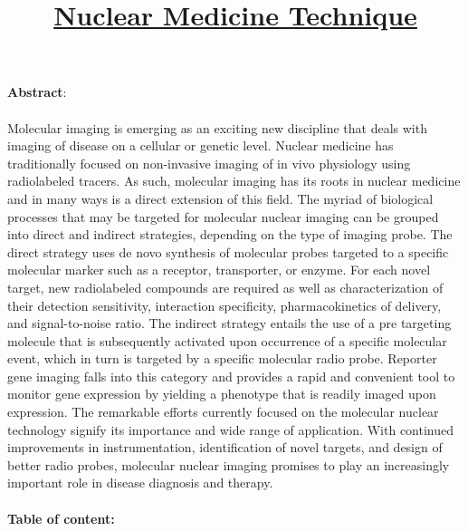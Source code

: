\documentclass[12pt]{article}
\title{\underline{Nuclear Medicine Technique}}
\date{}
\begin{document}
\maketitle
\noindent
\textbf{\large Abstract}:\\ \\ \large Molecular imaging is emerging as an exciting new discipline that deals with imaging of disease on a cellular or genetic level. Nuclear medicine has traditionally focused on non-invasive imaging of in vivo physiology using radiolabeled tracers. As such, molecular imaging has its roots in nuclear medicine and in many ways is a direct extension of this field. The myriad of biological processes that may be targeted for molecular nuclear imaging can be grouped into direct and indirect strategies, depending on the type of imaging probe. The direct strategy uses de novo synthesis of molecular probes targeted to a specific molecular marker such as a receptor, transporter, or enzyme. For each novel target, new radiolabeled compounds are required as well as characterization of their detection sensitivity, interaction specificity, pharmacokinetics of delivery, and signal-to-noise ratio. The indirect strategy entails the use of a pre targeting molecule that is subsequently activated upon occurrence of a specific molecular event, which in turn is targeted by a specific molecular radio probe. Reporter gene imaging falls into this category and provides a rapid and convenient tool to monitor gene expression by yielding a phenotype that is readily imaged upon expression. The remarkable efforts currently focused on the molecular nuclear technology signify its importance and wide range of application. With continued improvements in instrumentation, identification of novel targets, and design of better radio probes, molecular nuclear imaging promises to play an increasingly important role in disease diagnosis and therapy.
\noindent
\\ \\ \textbf{\large Table of content:}
\end{document}
